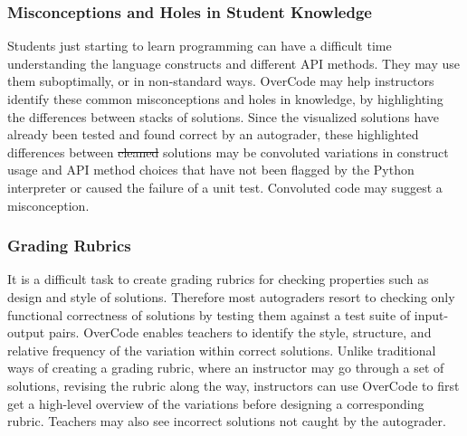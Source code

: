 \documentclass[12pt,twoside]{mitthesis}
\providecommand{\DIFaddtex}[1]{{\protect\color{blue}\uwave{#1}}} %
\providecommand{\DIFdeltex}[1]{{\protect\color{red}\sout{#1}}}                      %
\providecommand{\DIFaddbegin}{} %
\providecommand{\DIFaddend}{} %
\providecommand{\DIFdelbegin}{} %
\providecommand{\DIFdelend}{} %
\providecommand{\DIFadd}[1]{\texorpdfstring{\DIFaddtex{#1}}{#1}} %
\providecommand{\DIFdel}[1]{\texorpdfstring{\DIFdeltex{#1}}{}} %
\begin{document}
\DIFdelbegin %
\DIFdelend \DIFaddbegin \subsubsection{Misconceptions and Holes in Student Knowledge}
\DIFaddend Students just starting to learn programming can have a difficult time understanding the language constructs and different API methods. They may use them suboptimally, or in non-standard ways. OverCode may help instructors identify these common misconceptions and holes in knowledge, by highlighting the differences between stacks of solutions. Since the visualized solutions have already been tested and found correct by an autograder, these highlighted differences between \DIFdelbegin \DIFdel{cleaned }\DIFdelend \DIFaddbegin \DIFadd{platonic }\DIFaddend solutions may be convoluted variations in construct usage and API method choices that have not been flagged by the Python interpreter or caused the failure of a unit test. Convoluted code may suggest a misconception.

\DIFaddbegin {}

\DIFaddend \subsubsection{Grading Rubrics}
It is a difficult task to create grading rubrics for checking properties such as design and style of solutions. Therefore most autograders resort to checking only functional correctness of solutions by testing them against a test suite of input-output pairs. OverCode enables teachers to identify the style, structure, and relative frequency of the variation within correct solutions. Unlike traditional ways of creating a grading rubric, where an instructor may go through a set of solutions, revising the rubric along the way, instructors can use OverCode to first get a high-level overview of the variations before designing a corresponding rubric. Teachers may also see incorrect solutions not caught by the autograder.
\end{document}
